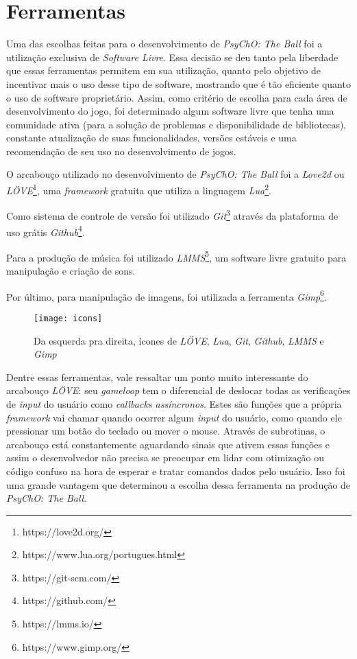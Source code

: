 \section{Ferramentas}
\label{sec:ferramentas}

Uma das escolhas feitas para o desenvolvimento de \textit{PsyChO: The Ball} foi a utilização exclusiva de \textit{Software Livre}. Essa decisão se deu tanto pela liberdade que essas ferramentas permitem em sua utilização, quanto pelo objetivo de incentivar mais o uso desse tipo de software, mostrando que é tão eficiente quanto o uso de software proprietário. Assim, como critério de escolha para cada área de desenvolvimento do jogo, foi determinado algum software livre que tenha uma comunidade ativa (para a solução de problemas e disponibilidade de bibliotecas), constante atualização de suas funcionalidades, versões estáveis e uma recomendação de seu uso no desenvolvimento de jogos.

O arcabouço utilizado no desenvolvimento de \textit{PsyChO: The Ball} foi a \textit{Love2d} ou \textit{LÖVE}\footnote{https://love2d.org/}, uma \textit{framework} gratuita que utiliza a linguagem \textit{Lua}\footnote{https://www.lua.org/portugues.html}.

Como sistema de controle de versão foi utilizado \textit{Git}\footnote{https://git-scm.com/} através da plataforma de uso grátis \textit{Github}\footnote{https://github.com/}.

Para a produção de música foi utilizado \textit{LMMS}\footnote{https://lmms.io/}, um software livre gratuito para manipulação e criação de sons.

Por último, para manipulação de imagens, foi utilizada a ferramenta \textit{Gimp}\footnote{https://www.gimp.org/}.

\begin{figure}[h!]
\texttt{[image: icons]}
\centering
\caption{Da esquerda pra direita, ícones de \textit{LÖVE}, \textit{Lua}, \textit{Git}, \textit{Github}, \textit{LMMS} e \textit{Gimp}}
\end{figure}

Dentre essas ferramentas, vale ressaltar um ponto muito interessante do arcabouço \textit{LÖVE}: seu \textit{gameloop} tem o diferencial de deslocar todas as verificações de \textit{input} do usuário como \textit{callbacks assíncronos}. Estes são funções que a própria \textit{framework} vai chamar quando ocorrer algum \textit{input} do usuário, como quando ele pressionar um botão do teclado ou mover o mouse. Através de subrotinas, o arcabouço está constantemente aguardando sinais que ativem essas funções e assim o desenvolvedor não precisa se preocupar em lidar com otimização ou código confuso na hora de esperar e tratar comandos dados pelo usuário. Isso foi uma grande vantagem que determinou a escolha dessa ferramenta na produção de \textit{PsyChO: The Ball}.

